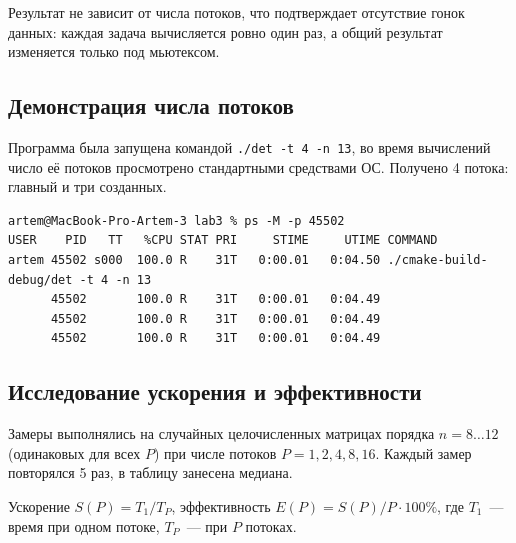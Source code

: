 \documentclass[pdf, unicode, 12pt, a4paper, oneside, fleqn]{article}
\begin{document}
Результат не зависит от числа потоков, что подтверждает отсутствие гонок данных:
каждая задача вычисляется ровно один раз, а общий результат изменяется только под мьютексом.

\subsection*{Демонстрация числа потоков}

Программа была запущена командой \texttt{./det -t 4 -n 13}, во время вычислений
число её потоков просмотрено стандартными средствами ОС. Получено 4 потока: главный
и три созданных.

\begin{lstlisting}[language={},numbers=none,escapechar={},columns=fixed,basicstyle=\footnotesize\ttfamily]
artem@MacBook-Pro-Artem-3 lab3 % ps -M -p 45502
USER    PID   TT   %CPU STAT PRI     STIME     UTIME COMMAND
artem 45502 s000  100.0 R    31T   0:00.01   0:04.50 ./cmake-build-debug/det -t 4 -n 13
      45502       100.0 R    31T   0:00.01   0:04.49
      45502       100.0 R    31T   0:00.01   0:04.49
      45502       100.0 R    31T   0:00.01   0:04.49
\end{lstlisting}

\subsection*{Исследование ускорения и эффективности}

Замеры выполнялись на случайных целочисленных матрицах порядка $n = 8 \dots 12$
(одинаковых для всех $P$) при числе потоков $P = 1, 2, 4, 8, 16$. Каждый замер
повторялся 5 раз, в таблицу занесена медиана.

Ускорение $S(P) = T_1 / T_P$, эффективность $E(P) = S(P) / P \cdot 100\%$,
где $T_1$~--- время при одном потоке, $T_P$~--- при $P$ потоках.
\end{document}
